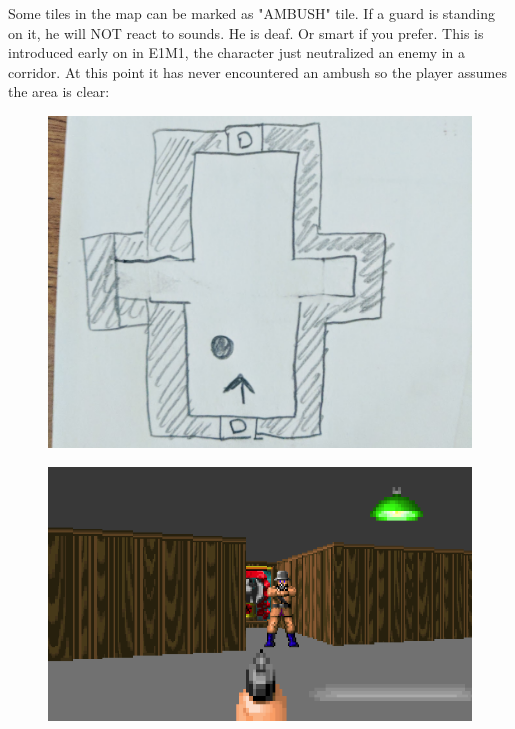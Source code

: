 \begin{minipage}{.6\textwidth}
Some tiles in the map can be marked as "AMBUSH" tile. If a guard is standing on it, he will NOT react to sounds. He is deaf. Or smart if you prefer. This is introduced early on in E1M1, the character just neutralized an enemy in a corridor. At this point it has never encountered an ambush so the player assumes the area is clear:\\
\end{minipage}
\begin{minipage}{.35\textwidth}
\hfill
\begin{figure}[H]
 \includegraphics[width=\textwidth]{imgs/ambush/map_unknown_drawing.png}
\end{figure}
\end{minipage}



\par
\begin{figure}[H]
 \centering
 \includegraphics[width=\textwidth]{imgs/ambush/map_ambushed.png}
\end{figure}
\par


